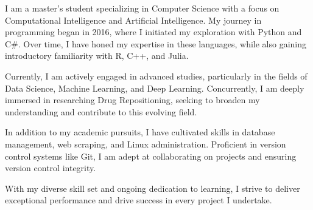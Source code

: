 

\begin{cvparagraph}

I am a master's student specializing in Computer Science with a focus on Computational Intelligence and Artificial Intelligence. My journey in programming began in 2016, where I initiated my exploration with Python and C\#. Over time, I have honed my expertise in these languages, while also gaining introductory familiarity with R, C++, and Julia.

Currently, I am actively engaged in advanced studies, particularly in the fields of Data Science, Machine Learning, and Deep Learning. Concurrently, I am deeply immersed in researching Drug Repositioning, seeking to broaden my understanding and contribute to this evolving field.

In addition to my academic pursuits, I have cultivated skills in database management, web scraping, and Linux administration. Proficient in version control systems like Git, I am adept at collaborating on projects and ensuring version control integrity.

With my diverse skill set and ongoing dedication to learning, I strive to deliver exceptional performance and drive success in every project I undertake.
\end{cvparagraph}